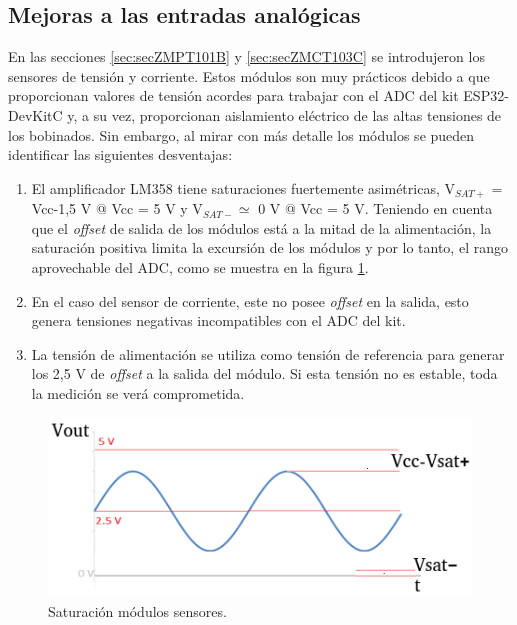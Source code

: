 \subsection{Mejoras a las entradas analógicas}
\label{subsec:mejorasAnalo}
En las secciones \ref{sec:secZMPT101B} y \ref{sec:secZMCT103C} se introdujeron los sensores de tensión y corriente. Estos módulos son muy prácticos debido a que proporcionan valores de tensión acordes para trabajar con el ADC del kit ESP32-DevKitC y, a su vez, proporcionan aislamiento eléctrico de las altas tensiones de los bobinados. Sin embargo, al mirar con más detalle los módulos se pueden identificar las siguientes desventajas:
\begin{enumerate}
\item El amplificador LM358 tiene saturaciones fuertemente asimétricas, V$_{SAT+}$ = Vcc-1,5 V @ Vcc = 5 V y V$_{SAT-} \simeq $  0 V @ Vcc = 5 V. Teniendo en cuenta que el \textit{offset} de salida de los módulos está a la mitad de la alimentación, la saturación positiva limita la excursión de los módulos y por lo tanto, el rango aprovechable del ADC, como se muestra en la figura \ref{fig:sensSat}. 
\item En el caso del sensor de corriente, este no posee \textit{offset} en la salida, esto genera tensiones negativas incompatibles con el ADC del kit.
\item La tensión de alimentación se utiliza como tensión de referencia para generar los 2,5 V de \textit{offset} a la salida del módulo. Si esta tensión no es estable, toda la medición se verá comprometida.
\end{enumerate}

\begin{figure}[htpb]
	\centering
	\includegraphics[scale=1]{./Figures/ZMPT101B_waves_sat.png}
	\caption{Saturación módulos sensores.}
	\label{fig:sensSat}
\end{figure}

